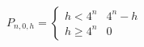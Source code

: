 

\[
    P_{n,0,h} =
    \begin{cases}
        h < 4^n & 4^n - h \\
        h \geq 4^n & 0
    \end{cases}
\]
